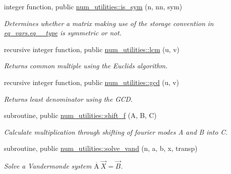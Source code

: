 \begin{DoxyCompactItemize}
integer function, public \hyperlink{namespacenum__utilities_a4e6994b5c92b3d16c8538b54db0beadd}{num\+\_\+utilities\+::is\+\_\+sym} (n, nn, sym)
\begin{DoxyCompactList}\small\item\em Determines whether a matrix making use of the storage convention in \hyperlink{structeq__vars_1_1eq__2__type}{eq\+\_\+vars.\+eq\+\_\+\_\+type} is symmetric or not. \end{DoxyCompactList}\item 
recursive integer function, public \hyperlink{namespacenum__utilities_a33fc1483c840d5d3f9b12acfce21cad1}{num\+\_\+utilities\+::lcm} (u, v)
\begin{DoxyCompactList}\small\item\em Returns common multiple using the Euclid\textquotesingle{}s algorithm. \end{DoxyCompactList}\item 
recursive integer function, public \hyperlink{namespacenum__utilities_a3d0d04a582b3a528fc7f9975d5d2a807}{num\+\_\+utilities\+::gcd} (u, v)
\begin{DoxyCompactList}\small\item\em Returns least denominator using the G\+CD. \end{DoxyCompactList}\item 
subroutine, public \hyperlink{namespacenum__utilities_a859f442a1b860d82662eed17c4374c38}{num\+\_\+utilities\+::shift\+\_\+f} (A, B, C)
\begin{DoxyCompactList}\small\item\em Calculate multiplication through shifting of fourier modes A and B into C. \end{DoxyCompactList}\item 
subroutine, public \hyperlink{namespacenum__utilities_a54c65e345182e2e7e13ac14a0ba3647a}{num\+\_\+utilities\+::solve\+\_\+vand} (n, a, b, x, transp)
\begin{DoxyCompactList}\small\item\em Solve a Vandermonde system $\overline{\text{A}} \ \vec{X} = \vec{B}$. \end{DoxyCompactList}\end{DoxyCompactItemize}
